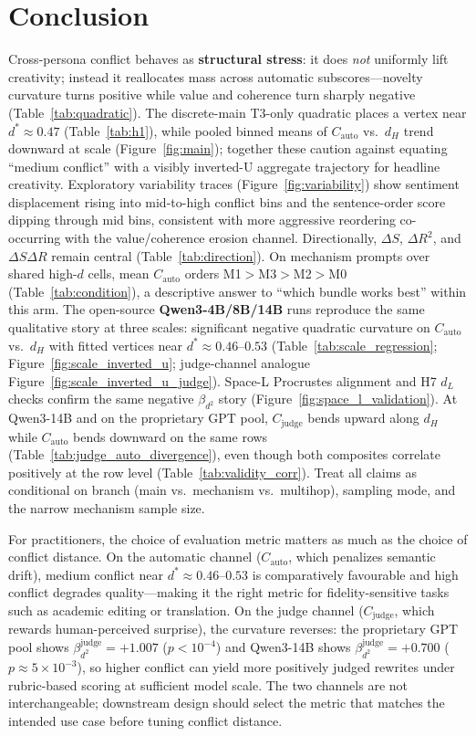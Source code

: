 \documentclass[sigconf,nonacm]{acmart}
\begin{document}
\section{Conclusion}

Cross-persona conflict behaves as \textbf{structural stress}: it does \emph{not} uniformly lift creativity; instead it reallocates mass across automatic subscores---novelty curvature turns positive while value and coherence turn sharply negative (Table~\ref{tab:quadratic}). The discrete-main T3-only quadratic places a vertex near $d^\ast{\approx}0.47$ (Table~\ref{tab:h1}), while pooled binned means of $C_{\mathrm{auto}}$ vs.\ $d_H$ trend downward at scale (Figure~\ref{fig:main}); together these caution against equating ``medium conflict'' with a visibly inverted-U aggregate trajectory for headline creativity.
Exploratory variability traces (Figure~\ref{fig:variability}) show sentiment displacement rising into mid-to-high conflict bins and the sentence-order score dipping through mid bins, consistent with more aggressive reordering co-occurring with the value/coherence erosion channel.
Directionally, $\Delta S$, $\Delta R^2$, and $\Delta S\Delta R$ remain central (Table~\ref{tab:direction}). On mechanism prompts over shared high-$d$ cells, mean $C_{\mathrm{auto}}$ orders M1${>}$M3${>}$M2${>}$M0 (Table~\ref{tab:condition}), a descriptive answer to ``which bundle works best'' within this arm.
The open-source \textbf{Qwen3-4B/8B/14B} runs reproduce the same qualitative story at three scales: significant negative quadratic curvature on $C_{\mathrm{auto}}$ vs.\ $d_H$ with fitted vertices near $d^\ast{\approx}0.46$--$0.53$ (Table~\ref{tab:scale_regression}; Figure~\ref{fig:scale_inverted_u}; judge-channel analogue Figure~\ref{fig:scale_inverted_u_judge}).
Space-L Procrustes alignment and H7 $d_L$ checks confirm the same negative $\beta_{d^2}$ story (Figure~\ref{fig:space_l_validation}).
At Qwen3-14B and on the proprietary GPT pool, $C_{\mathrm{judge}}$ bends upward along $d_H$ while $C_{\mathrm{auto}}$ bends downward on the same rows (Table~\ref{tab:judge_auto_divergence}), even though both composites correlate positively at the row level (Table~\ref{tab:validity_corr}).
Treat all claims as conditional on branch (main vs.\ mechanism vs.\ multihop), sampling mode, and the narrow mechanism sample size.

For practitioners, the choice of evaluation metric matters as much as the choice of conflict distance. On the automatic channel ($C_{\mathrm{auto}}$, which penalizes semantic drift), medium conflict near $d^\ast{\approx}0.46$--$0.53$ is comparatively favourable and high conflict degrades quality---making it the right metric for fidelity-sensitive tasks such as academic editing or translation. On the judge channel ($C_{\mathrm{judge}}$, which rewards human-perceived surprise), the curvature reverses: the proprietary GPT pool shows $\beta_{d^2}^{\mathrm{judge}}{=}{+}1.007$ ($p{<}10^{-4}$) and Qwen3-14B shows $\beta_{d^2}^{\mathrm{judge}}{=}{+}0.700$ ($p{\approx}5{\times}10^{-3}$), so higher conflict can yield more positively judged rewrites under rubric-based scoring at sufficient model scale. The two channels are not interchangeable; downstream design should select the metric that matches the intended use case before tuning conflict distance.
\end{document}
